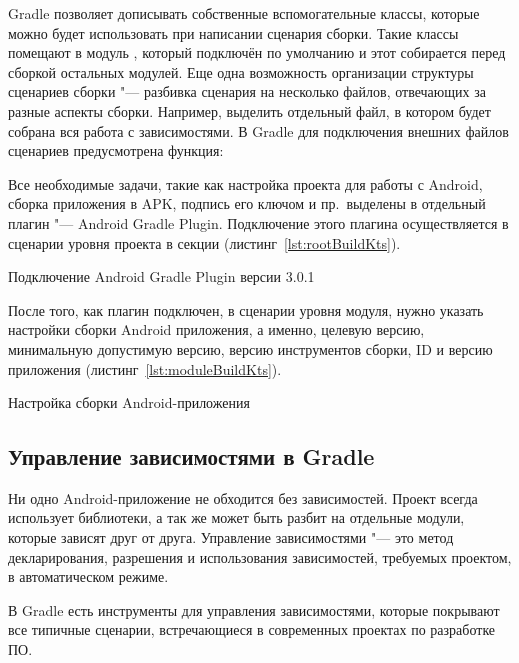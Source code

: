 Gradle позволяет дописывать собственные вспомогательные классы, которые можно будет использовать при написании сценария сборки.
Такие классы помещают в модуль , который подключён по умолчанию и этот собирается перед сборкой остальных модулей.
Еще одна возможность организации структуры сценариев сборки "--- разбивка сценария на несколько файлов, отвечающих за разные аспекты сборки.
Например, выделить отдельный файл, в котором будет собрана вся работа с зависимостями.
В Gradle для подключения внешних файлов сценариев предусмотрена функция:

Все необходимые задачи, такие как настройка проекта для работы с Android, сборка приложения в APK, подпись его ключом и пр.\ выделены в отдельный плагин "--- Android Gradle Plugin.
Подключение этого плагина осуществляется в сценарии уровня проекта в секции  (листинг~\ref{lst:rootBuildKts}).

\begin{listing}[H]
  \caption{Подключение Android Gradle Plugin версии 3.0.1}
  \label{lst:rootBuildKts}
\end{listing}

После того, как плагин подключен, в сценарии уровня модуля, нужно указать настройки сборки Android приложения, а именно, целевую версию, минимальную допустимую версию, версию инструментов сборки, ID и версию приложения (листинг~\ref{lst:moduleBuildKts}).

\begin{listing}[H]
  \caption{Настройка сборки Android-приложения}
  \label{lst:moduleBuildKts}
\end{listing}

\subsection{Управление зависимостями в Gradle}
\label{subsec:libs}

Ни одно Android-приложение не обходится без зависимостей.
Проект всегда использует библиотеки, а так же может быть разбит на отдельные модули, которые зависят друг от друга.
Управление зависимостями "--- это метод декларирования, разрешения и использования зависимостей, требуемых проектом, в автоматическом режиме.

В Gradle есть инструменты для управления зависимостями, которые покрывают все типичные сценарии, встречающиеся в современных проектах по разработке ПО\@.


